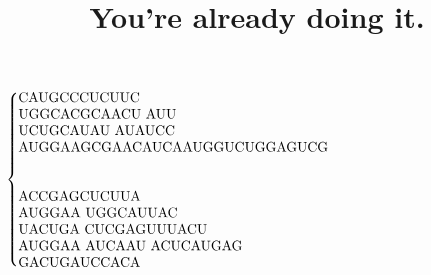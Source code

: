 \documentclass[12pt]{article}
\title{You're already doing it.}
\date{}
\begin{document}
\maketitle
\thispagestyle{empty}
\begin{center}
$\begin{cases}
\parbox{\textwidth}{CAUGCCCUCUUC\\
UGGCACGCAACU
AUU \\
UCUGCAUAU 
AUAUCC \\
AUGGAAGCGAACAUCAAUGGUCUGGAGUCG}\\
\ \\
\ \\
\parbox{\textwidth}{ACCGAGCUCUUA \\
AUGGAA 
UGGCAUUAC \\
UACUGA 
CUCGAGUUUACU\\ 
AUGGAA 
AUCAAU 
ACUCAUGAG \\
GACUGAUCCACA}
\end{cases}
$
\end{center}
\end{document}
